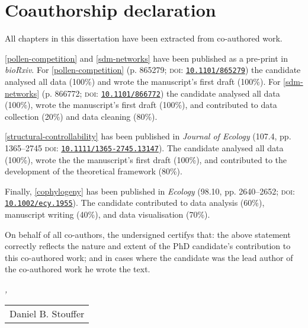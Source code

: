 
{}
\chapter*{Coauthorship declaration}
\thispagestyle{empty}

\begin{refsection}

All chapters in this dissertation have been extracted from co-authored work.

\autoref{pollen-competition} and \autoref{sdm-networks} have been published as a pre-print in \emph{bioRxiv}.
For \autoref{pollen-competition} (p. 865279; \textsc{doi}: \href{https://doi.org/10.1101/865279}{\texttt{10.1101/865279}}) the candidate analysed all data (100\%) and wrote the manuscript's first draft (100\%).
For \autoref{sdm-networks} (p. 866772; \textsc{doi}: \href{https://doi.org/10.1101/866772}{\texttt{10.1101/866772}}) the candidate analysed all data (100\%), wrote the manuscript's first draft (100\%), and contributed to data collection (20\%) and data cleaning (80\%).

\autoref{structural-controllability} has been published in \emph{Journal of Ecology} (107.4, pp. 1365--2745 \textsc{doi}: \href{https://doi.org/10.1111/1365-2745.13147}{\texttt{10.1111/1365-2745.13147}}). The candidate analysed all data (100\%), wrote the the manuscript's first draft (100\%), and contributed to the development of the theoretical framework (80\%).

Finally, \autoref{cophylogeny} has been published in \emph{Ecology} (98.10, pp. 2640--2652; \textsc{doi}: \href{https://doi.org/10.1002/ecy.1955}{\texttt{10.1002/ecy.1955}}). The candidate contributed to data analysis (60\%), manuscript writing (40\%), and data visualisation (70\%).

\end{refsection}

On behalf of all co-authors, the undersigned certifys that: the above statement correctly reflects the nature and extent of the PhD candidate's contribution to this co-authored work; and in cases where the candidate was the lead author of the co-authored work he wrote the text.

\bigskip

\noindent\textit{\myLocation, \myTime}

\smallskip

\begin{flushright}
    \begin{tabular}{m{5cm}}
        \\ \hline
        \centering Daniel B. Stouffer \\
    \end{tabular}
\end{flushright}
